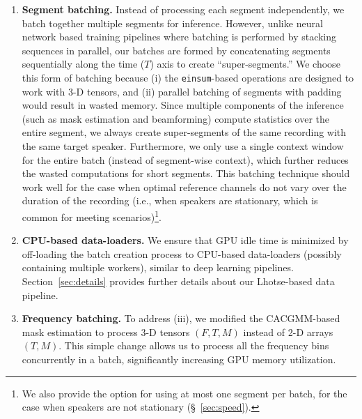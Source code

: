 \documentclass[a4paper]{article}
\begin{document}
\begin{enumerate}[wide, labelwidth=!, labelindent=0pt]
\item \textbf{Segment batching.} Instead of processing each segment independently, we batch together multiple segments for inference. However, unlike neural network based training pipelines where batching is performed by stacking sequences in parallel, our batches are formed by concatenating segments sequentially along the time ($T$) axis to create ``super-segments.'' We choose this form of batching because (i) the \texttt{einsum}-based operations are designed to work with 3-D tensors, and (ii) parallel batching of segments with padding would result in wasted memory. Since multiple components of the inference (such as mask estimation and beamforming) compute statistics over the entire segment, we always create super-segments of the same recording with the same target speaker. Furthermore, we only use a single context window for the entire batch (instead of segment-wise context), which further reduces the wasted computations for short segments. This batching technique should work well for the case when optimal reference channels do not vary over the duration of the recording (i.e., when speakers are stationary, which is common for meeting scenarios)\footnote{We also provide the option for using at most one segment per batch, for the case when speakers are not stationary (\S~\ref{sec:speed}).}.

\item \textbf{CPU-based data-loaders.} We ensure that GPU idle time is minimized by off-loading the batch creation process to CPU-based data-loaders (possibly containing multiple workers), similar to deep learning pipelines. Section~\ref{sec:details} provides further details about our Lhotse-based data pipeline.

\item \textbf{Frequency batching.} To address (iii), we modified the CACGMM-based mask estimation to process 3-D tensors $(F,T,M)$ instead of 2-D arrays $(T,M)$. This simple change allows us to process all the frequency bins concurrently in a batch, significantly increasing GPU memory utilization.


\end{enumerate}
\end{document}
